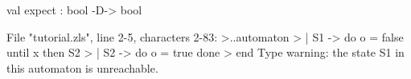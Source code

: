 \chklistingtrue
{}
\begin{ChkListingMsg}
val expect : bool -D-> bool
\end{ChkListingMsg}
\begin{ChkListingErr}
File "tutorial.zls", line 2-5, characters 2-83:
>..automaton
>  | S1 -> do o = false until x then S2
>  | S2 -> do o = true done
>  end
Type warning: the state S1 in this automaton is unreachable.
\end{ChkListingErr}
